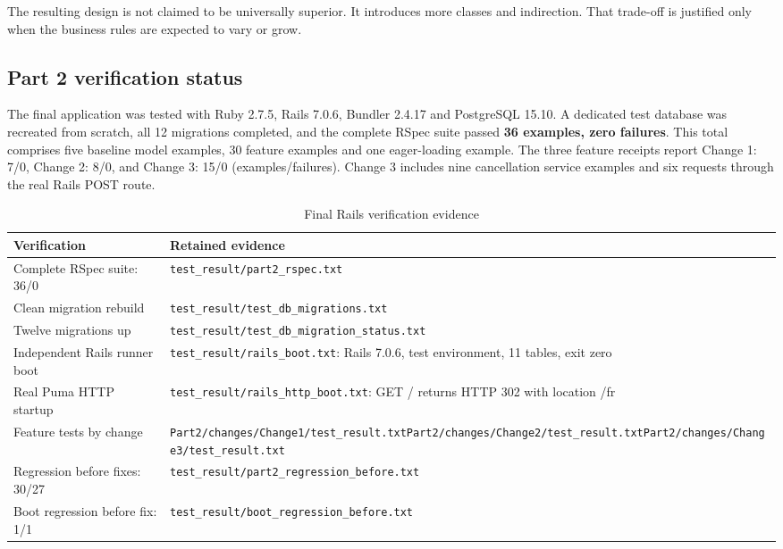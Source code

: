 \documentclass[10pt,a4paper]{article}
\newcommand{\code}[1]{\texttt{\small #1}}
\begin{document}
The resulting design is not claimed to be universally superior. It introduces more classes and indirection. That trade-off is justified only when the business rules are expected to vary or grow.

\subsection{Part 2 verification status}

The final application was tested with Ruby 2.7.5, Rails 7.0.6, Bundler 2.4.17 and PostgreSQL 15.10. A dedicated test database was recreated from scratch, all 12 migrations completed, and the complete RSpec suite passed \textbf{36 examples, zero failures}. This total comprises five baseline model examples, 30 feature examples and one eager-loading example. The three feature receipts report Change 1: 7/0, Change 2: 8/0, and Change 3: 15/0 (examples/failures). Change 3 includes nine cancellation service examples and six requests through the real Rails POST route.

\begin{table}[H]
\centering
\caption{Final Rails verification evidence}
\begin{tabularx}{\linewidth}{lX}
\toprule
Verification & Retained evidence\\
\midrule
Complete RSpec suite: 36/0 & \code{test\_result/part2\_rspec.txt}\\
Clean migration rebuild & \code{test\_result/test\_db\_migrations.txt}\\
Twelve migrations up & \code{test\_result/test\_db\_migration\_status.txt}\\
Independent Rails runner boot & \code{test\_result/rails\_boot.txt}: Rails 7.0.6, test environment, 11 tables, exit zero\\
Real Puma HTTP startup & \code{test\_result/rails\_http\_boot.txt}: GET / returns HTTP 302 with location /fr\\
Feature tests by change & \code{Part2/changes/Change1/test\_result.txt}\newline \code{Part2/changes/Change2/test\_result.txt}\newline \code{Part2/changes/Change3/test\_result.txt}\\
Regression before fixes: 30/27 & \code{test\_result/part2\_regression\_before.txt}\\
Boot regression before fix: 1/1 & \code{test\_result/boot\_regression\_before.txt}\\
\bottomrule
\end{tabularx}
\end{table}
\end{document}
